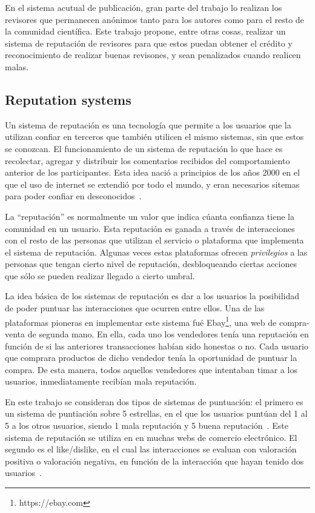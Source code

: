 En el sistema acutual de publicación, gran parte del trabajo lo realizan los
revisores que permanecen anónimos tanto para los autores como para el resto de
la comunidad científica. Este trabajo propone, entre otras cosas, realizar un
sistema de reputación de revisores para que estos puedan obtener el crédito y
reconocimiento de realizar buenas revisones, y sean penalizados cuando realicen
malas.

\subsection{Reputation systems}
\label{scb:rs}
Un sistema de reputación es una tecnología que permite a los usuarios que la
utilizan confiar en terceros que también utilicen el mismo sistemas, sin que
estos se conozcan. El funcionamiento de un sistema de reputación lo que hace es
recolectar, agregar y distribuir los comentarios recibidos del comportamiento
anterior de los participantes. Esta idea nació a principios de los años 2000 en
el que el uso de internet se extendió por todo el mundo, y eran necesarios
sitemas para poder confiar en desconocidos~\cite{resnick2000reputation}.


La ``reputación'' es normalmente un valor que indica cúanta confianza tiene la
comunidad en un usuario. Esta reputación es ganada a través de interacciones con
el resto de las personas que utilizan el servicio o plataforma que implementa el
sistema de reputación. Algunas veces estas plataformas ofrecen
\emph{privilegios} a las personas que tengan cierto nivel de reputación,
desbloqueando ciertas acciones que sólo se pueden realizar llegado a cierto
umbral.

La idea básica de los sistemas de reputación es dar a los usuarios la
posibilidad de poder puntuar las interacciones que ocurren entre ellos. Una de
las plataformas pioneras en implementar este sistema fué
Ebay\footnote{https://ebay.com}, una web de compra-venta de segunda mano. En
ella, cada uno los vendedores tenía una reputación en función de si las
anteriores transacciones habían sido honestas o no. Cada usuario que comprara
productos de dicho vendedor tenía la oportunidad de puntuar la compra. De esta
manera, todos aquellos vendedores que intentaban timar a los usuarios,
inmediatamente recibían mala reputación.

En este trabajo se consideran dos tipos de sistemas de puntuación: el primero es
un sistema de puntiación sobre 5 estrellas, en el que los usuarios puntúan del 1
al 5 a los otros usuarios, siendo 1 mala reputación y 5 buena
reputación~\cite{}. Este sistema de reputación se utiliza en en muchas webs de
comercio electrónico. El segundo es el like/dislike, en el cual las
interacciones se evaluan con valoración positiva o valoración negativa, en
función de la interacción que hayan tenido dos usuarios~\cite{}.

